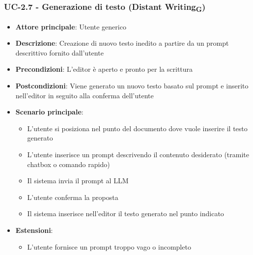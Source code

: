 \documentclass[11pt,a4paper]{article}
\newcommand{\gls}[1]{#1\textsubscript{G}}
\begin{document}
\subsubsection{UC-2.7 - Generazione di testo (\gls{Distant Writing})}
\begin{itemize}
    \item \textbf{Attore principale}: Utente generico
    \item \textbf{Descrizione}: Creazione di nuovo testo inedito a partire da un prompt descrittivo fornito dall’utente
    \item \textbf{Precondizioni}: L’editor è aperto e pronto per la scrittura
    \item \textbf{Postcondizioni}: Viene generato un nuovo testo basato sul prompt e inserito nell’editor in seguito alla conferma dell'utente
    \item \textbf{Scenario principale}:
    \begin{itemize}
        \item L’utente si posiziona nel punto del documento dove vuole inserire il testo generato
        \item L’utente inserisce un prompt descrivendo il contenuto desiderato (tramite chatbox o comando rapido)
        \item Il sistema invia il prompt al LLM
        \item L'utente conferma la proposta
        \item Il sistema inserisce nell'editor il testo generato nel punto indicato
    \end{itemize}
    \item \textbf{Estensioni}:
    \begin{itemize}
        \item L’utente fornisce un prompt troppo vago o incompleto
    \end{itemize}
\end{itemize}
\end{document}
